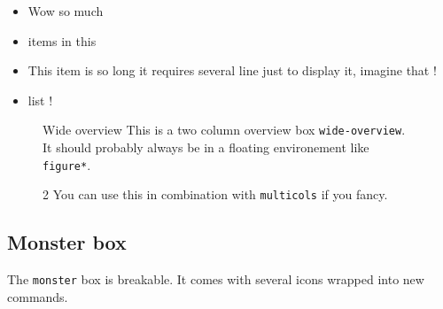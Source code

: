 \documentclass[mmgreen]{dnd4e}
\begin{document}
\begin{textbox}
  \lipsum[][1-2]
	\begin{itemize}
		\item Wow so much
		\item items in this
		\item This item is so long it requires several line just to display it, imagine that !
		\item list !
	\end{itemize}
\end{textbox}


\begin{figure}[b!]
	\begin{wide-overview}{Wide overview}
		This is a two column overview box \texttt{wide-overview}. It should probably always be in a floating environement like \texttt{figure*}.



		\begin{multicols}{2}
			You can use this in combination with \texttt{multicols} if you fancy.

			\vspace{1cm}

			\lipsum[1]
		\end{multicols}
	\end{wide-overview}
\end{figure}

\subsection{Monster box}

The \texttt{monster} box is breakable. It comes with several icons wrapped into new commands.
\end{document}
